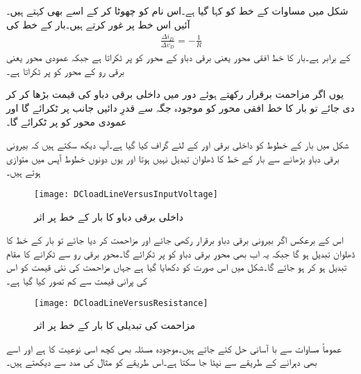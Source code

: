 شکل  میں مساوات   کے خط کو  کہا گیا ہے۔اس نام کو چھوٹا کر کے اسے   بھی کہتے ہیں۔آئیں اس خط پر غور کرتے ہیں۔بار کے خط کی 
\begin{align*}
\frac{\Delta i_D}{\Delta v_D}=-\frac{1}{R}
\end{align*}
کے برابر ہے۔بار کا خط افقی محور یعنی برقی دباو  کے محور کو  پر ٹکراتا ہے جبکہ عمودی محور یعنی برقی رو  کے محور کو   پر ٹکراتا ہے۔

یوں اگر مزاحمت برقرار رکھتے ہوئے دور میں داخلی برقی دباو  کی قیمت بڑھا کر  کر دی جائے تو بار کا خط افقی محور کو موجودہ جگہ سے قدرِ دائیں جانب  پر ٹکرائے گا اور عمودی محور کو    پر ٹکرائے گا۔

شکل   میں بار کے خطوط کو داخلی برقی   اور  کے لئے گراف کیا گیا ہے۔آپ دیکھ سکتے ہیں کہ بیرونی برقی دباو بڑھانے سے  بار کے خط کا ڈھلوان تبدیل نہیں ہوتا اور یوں دونوں خطوط آپس میں متوازی ہوتے ہیں۔
\begin{figure}
\centering
\texttt{[image: DCloadLineVersusInputVoltage]}
\caption{داخلی برقی دباو کا بار کے خط پر اثر}
\label{شکل_داخلی_برقی_دباو_کا_بار_کے_خط_پر_اثر}
\end{figure}
اس کے برعکس اگر بیرونی برقی دباو  برقرار رکھی جائے اور مزاحمت  کر دیا جائے تو بار کے خط کا ڈھلوان تبدیل ہو گا جبکہ یہ اب بھی محورِ برقی دباو کو  پر ٹکرائے گا۔محورِ برقی رو سے ٹکرانے کا مقام تبدیل ہو کر  ہو جائے گا۔شکل   میں اس صورت کو دکھایا گیا ہے جہاں مزاحمت کی نئی قیمت  کو اس کی پرانی قیمت  سے کم تصور کیا گیا ہے۔
\begin{figure}
\centering
\texttt{[image: DCloadLineVersusResistance]}
\caption{مزاحمت کی تبدیلی کا بار کے خط پر اثر}
\label{شکل_مزاحمت_کا_بار_کے_خط_پر_اثرات}
\end{figure}
عموماً مساوات   سے با آسانی حل کئے جاتے ہیں۔موجودہ مسئلہ بھی کچھ اسی نوعیت کا ہے اور اسے بھی دہرانے کے طریقے سے نپٹا جا سکتا ہے۔اس طریقے کو مثال کی مدد سے دیکھتے ہیں۔

